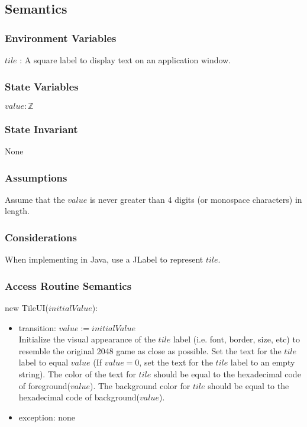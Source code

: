 \documentclass[12pt]{article}
\begin{document}
\subsection* {Semantics}

\subsubsection* {Environment Variables}

$tile$ : A square label to display text on an application window.

\subsubsection* {State Variables}

$value : \mathbb{Z}$

\subsubsection* {State Invariant}

None

\subsubsection* {Assumptions}

Assume that the $value$ is never greater than 4 digits (or monospace characters) in length.

\subsubsection* {Considerations}

When implementing in Java, use a JLabel to represent $tile$.

\newpage

\subsubsection* {Access Routine Semantics}

\noindent new TileUI($initialValue$):
\begin{itemize}
\item transition: $value := initialValue$\\
Initialize the visual appearance of the $tile$ label (i.e. font, border, size, etc) to resemble the original 2048 game as close as possible. Set the text for the $tile$ label to equal $value$ (If $value = 0$, set the text for the $tile$ label to an empty string). The color of the text for $tile$ should be equal to the hexadecimal code of foreground($value$). The background color for $tile$ should be equal to the hexadecimal code of background($value$).
\item exception: none
\end{itemize}
\end{document}
